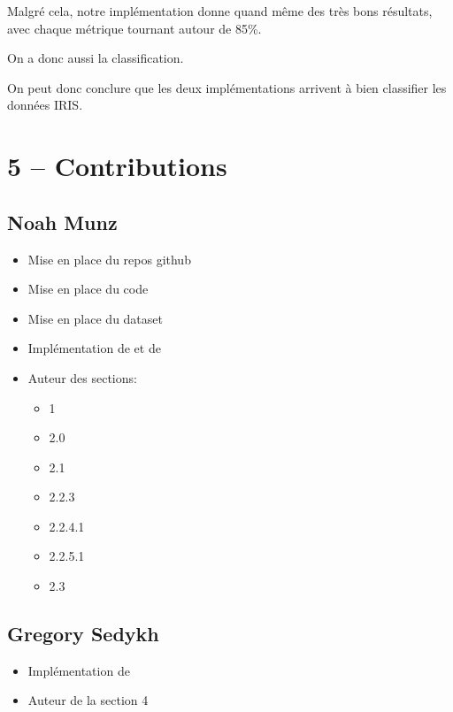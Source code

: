\documentclass[
]{article}
\providecommand{\tightlist}{%
  \setlength{\itemsep}{0pt}\setlength{\parskip}{0pt}}
\begin{document}
Malgré cela, notre implémentation donne quand même des très bons
résultats, avec chaque métrique tournant autour de 85\%.

On a donc aussi la classification.

On peut donc conclure que les deux implémentations arrivent à bien
classifier les données IRIS.

\newpage{}

\section{5 -- Contributions}\label{contributions}

\subsection{Noah Munz}\label{noah-munz}

\begin{itemize}
\tightlist
\item
  Mise en place du repos github
\item
  Mise en place du code
\item
  Mise en place du dataset
\item
  Implémentation de  et de 
\item
  Auteur des sections:

  \begin{itemize}
  \tightlist
  \item
    1
  \item
    2.0
  \item
    2.1
  \item
    2.2.3
  \item
    2.2.4.1
  \item
    2.2.5.1
  \item
    2.3
  \end{itemize}
\end{itemize}

\subsection{Gregory Sedykh}\label{gregory-sedykh}

\begin{itemize}
\tightlist
\item
  Implémentation de 
\item
  Auteur de la section 4
\end{itemize}
\end{document}
